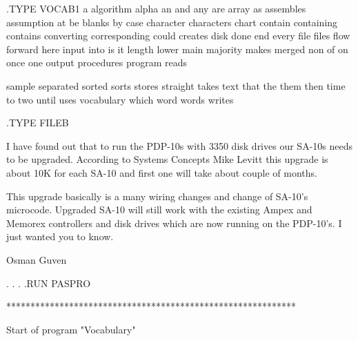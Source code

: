 .TYPE VOCAB1
a                   
algorithm           
alpha               
an                  
and                 
any                 
are                 
array               
as                  
assembles           
assumption          
at                  
be                  
blanks              
by                  
case                
character           
characters          
chart               
contain             
containing          
contains            
converting          
corresponding       
could               
creates             
disk                
done                
end                 
every               
file                
files               
flow                
forward             
here                
input               
into                
is                  
it                  
length              
lower               
main                
majority            
makes               
merged              
non                 
of                  
on                  
once                
one                 
output              
procedures          
program             
reads

               
sample              
separated           
sorted              
sorts               
stores              
straight            
takes               
text                
that                
the                 
them                
then                
time                
to                  
two                 
until               
uses                
vocabulary          
which               
word                
words               
writes              


.TYPE FILEB


        I have found out that to run the PDP-10s with 3350 disk drives
our SA-10s needs to be upgraded. According to Systems Concepts Mike Levitt
this upgrade is about 10K for each SA-10 and first one will take about
couple of months.

        This upgrade basically is a many wiring changes and change of 
SA-10's microcode. Upgraded SA-10 will still work with the existing Ampex
and Memorex controllers and disk drives which are now running on the
PDP-10's. I just wanted you to know.


                                                Osman Guven

.
.
.
.RUN PASPRO

************************************************************

Start of program "Vocabulary"

